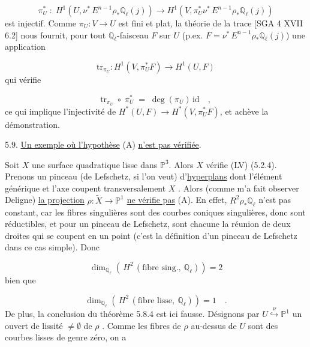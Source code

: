 \begin{equation*}
\pi_U^* \;:\; H^1(U,\nu^*\, E^{n-1}\rho_*\mathbb{Q}_\ell(j)) \longrightarrow H^1(V,\pi_U^*\nu^*\, E^{n-1}\rho_*\mathbb{Q}_\ell(j))
\end{equation*}
est injectif. Comme $\pi_U : V \longrightarrow U$ est fini et plat, la théorie de la trace [SGA 4 XVII 6.2] nous fournit, pour tout $\mathbb{Q}_\ell$-faisceau $F$ sur $U$ (p.ex. $F = \nu^*\, E^{n-1}\rho_*\mathbb{Q}_\ell(j)$) une application

\begin{equation*}
\mathrm{tr}_{\pi_U} : H^1(V,\pi_U^*F) \longrightarrow H^1(U,F)
\end{equation*}
qui vérifie

\begin{equation*}
\mathrm{tr}_{\pi_U} \;\circ\; \pi_U^* \;=\; \deg(\pi_U)\,\mathrm{id} \quad ,
\end{equation*}
ce qui implique l'injectivité de $H^*(U,F) \longrightarrow H^*(V,\pi_U^*F)$, et achève la démonstration.




5.9. \underline{Un exemple où l'hypothèse} (A) \underline{n'est pas vérifiée}.

Soit $X$ une surface quadratique lisse dans $\mathbb{P}^3$. Alors $X$ vérifie (LV) (5.2.4). Prenons un pinceau (de Lefschetz, si l'on veut) d'\underline{hyperplans} dont l'élément générique et l'axe coupent transversalement $X$ . Alors (comme m'a fait observer Deligne) \underline{la projection} $\rho : \widetilde{X} \longrightarrow \mathbb{P}^1$ \underline{ne vérifie pas} (A). En effet, $R^2\rho_*\mathbb{Q}_\ell$ n'est pas constant, car les fibres singulières sont des courbes coniques singulières, donc sont réductibles, et pour un pinceau de Lefschetz, sont chacune la réunion de deux droites qui se coupent en un point (c'est la définition d'un pinceau de Lefschetz dans ce cas simple). Donc

\begin{equation*}
\dim_{\mathbb{Q}_\ell}\left(\, H^2\,(\text{fibre sing.},\ \mathbb{Q}_\ell)\right) = 2
\end{equation*}
bien que

\begin{equation*}
\dim_{\mathbb{Q}_\ell}\left(\, H^2\,(\text{fibre lisse},\ \mathbb{Q}_\ell)\right) = 1 \quad .
\end{equation*}
De plus, la conclusion du théorème 5.8.4 est ici fausse. Désignons par $U \stackrel{\nu}{\hookrightarrow} \mathbb{P}^1$ un ouvert de lissité $\neq \emptyset$ de $\rho$ . Comme les fibres de $\rho$ au-dessus de $U$ sont des courbes lisses de genre zéro, on a

